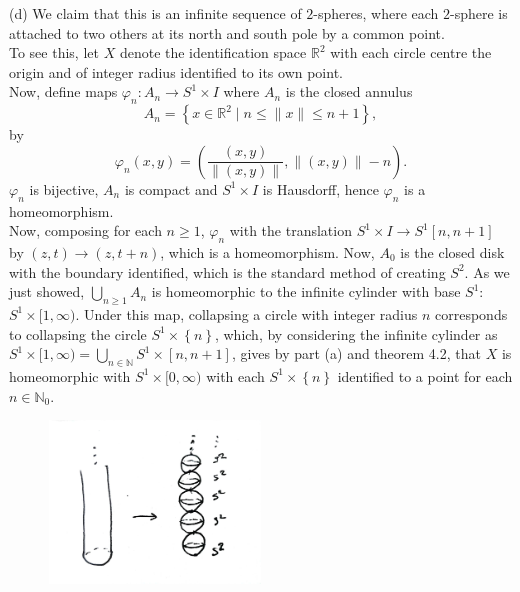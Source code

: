 \documentclass[a4paper]{article}
\begin{document}
   (d) We claim that this is an infinite sequence of $2$-spheres, where
   each $2$-sphere is attached to two others at its north and south pole by a
   common point.\\
   To see this, let $X$ denote the identification space $\mathbb{R}^2$ with
   each
   circle centre the origin and of integer radius identified to its own
   point.\\
   Now, define maps
   $\varphi_n  \colon A_n \to S^{1} \times I$ where $A_n$ is the closed annulus 
   \[
   A_n = \left\{ x \in \mathbb{R}^2  \mid n \le \|x\| \le n+1 \right\},
   \] 
   by
   \[
   \varphi_n (x,y) = \left( \frac{(x,y)}{\|(x,y)\|}, \|(x,y)\|-n \right).
   \] 
   $\varphi_n$ is bijective, $A_n$ is compact and $S^{1} \times I$ is
   Hausdorff, hence $\varphi_n$ is a homeomorphism.\\
   Now, composing for each $n \ge 1$, $\varphi_n$ with the translation
   $S^{1} \times I \to S^{1} \left[ n, n+1 \right] $ by
   $(z,t) \to (z, t+ n)$, which is a homeomorphism. Now,
   $A_0$ is the closed disk with the boundary identified, which is the standard
   method of creating $S^{2}$. As we just showed,
   $\bigcup_{n \ge 1} A_n$ is homeomorphic to the infinite cylinder with base
   $S^{1}$: $S^{1} \times [ 1, \infty )$. Under this map, collapsing a circle
   with integer radius $n$ corresponds to collapsing the circle
   $S^{1} \times \left\{ n \right\} $, which, by considering the infinite
   cylinder as
   $S^{1} \times [1, \infty) = \bigcup_{n \in \mathbb{N}} S^{1} \times
   [n,n+1]$,
   gives by part (a) and theorem 4.2, that
   $X$ is homeomorphic with
   $S^{1} \times [0, \infty)$ with each $S^{1} \times \left\{ n \right\}
   $ identified to a point for each $n \in \mathbb{N}_0$.
   
   
\begin{figure}[H]
    \centering
    \includegraphics[width=0.5\textwidth]{4.jpeg}
    \label{fig:4-jpeg}
\end{figure}
\end{document}

